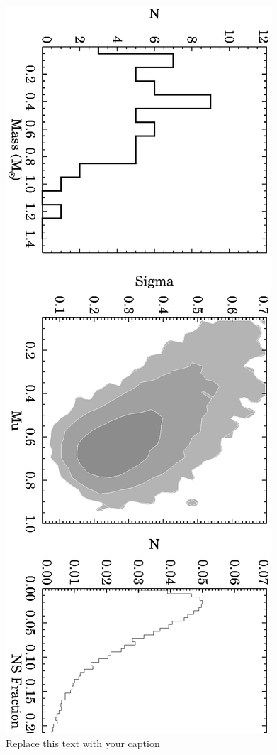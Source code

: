 \documentclass[letterpaper,12pt,preprint]{aastex}
\begin{document}
\begin{figure}[h!]
\begin{center}
\includegraphics[angle=90,width=1\columnwidth]{ELM_post.eps}
\caption{Replace this text with your caption}
\end{center}
\end{figure}
\end{document}
